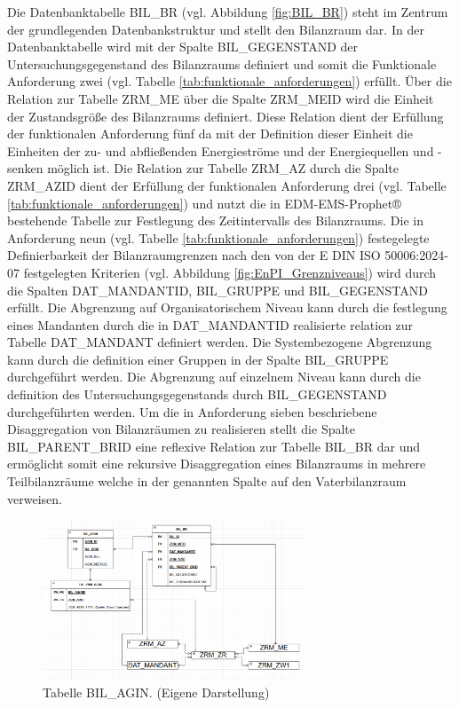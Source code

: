 Die Datenbanktabelle BIL\_BR (vgl. Abbildung \eqref{fig:BIL_BR}) steht im Zentrum der grundlegenden Datenbankstruktur und stellt den Bilanzraum dar.
In der Datenbanktabelle wird mit der Spalte BIL\_GEGENSTAND der Untersuchungsgegenstand des Bilanzraums definiert und somit die Funktionale Anforderung 
zwei (vgl. Tabelle \eqref{tab:funktionale_anforderungen}) erfüllt.
Über die Relation zur Tabelle ZRM\_ME über die Spalte ZRM\_MEID wird die Einheit der Zustandsgröße des Bilanzraums definiert.
Diese Relation dient der Erfüllung der funktionalen Anforderung fünf da mit der Definition dieser Einheit die Einheiten der zu- und abfließenden Energieströme und 
der Energiequellen und -senken möglich ist.
Die Relation zur Tabelle ZRM\_AZ durch die Spalte ZRM\_AZID dient der Erfüllung der funktionalen Anforderung drei (vgl. Tabelle \eqref{tab:funktionale_anforderungen}) und nutzt die 
in EDM-EMS-Prophet® bestehende Tabelle zur Festlegung des Zeitintervalls des Bilanzraums.
Die in Anforderung neun (vgl. Tabelle \eqref{tab:funktionale_anforderungen}) festegelegte Definierbarkeit der Bilanzraumgrenzen nach den von der E DIN ISO 50006:2024-07 
festgelegten Kriterien (vgl. Abbildung \eqref{fig:EnPI_Grenzniveaus}) wird durch die Spalten DAT\_MANDANTID, BIL\_GRUPPE und BIL\_GEGENSTAND erfüllt.
Die Abgrenzung auf Organisatorischem Niveau kann durch die festlegung eines Mandanten durch die in DAT\_MANDANTID realisierte relation zur Tabelle 
DAT\_MANDANT definiert werden. 
Die Systembezogene Abgrenzung kann durch die definition einer Gruppen in der Spalte BIL\_GRUPPE durchgeführt werden. 
Die Abgrenzung auf einzelnem Niveau kann durch die definition des Untersuchungsgegenstands durch BIL\_GEGENSTAND durchgeführten werden.
Um die in Anforderung sieben beschriebene Disaggregation von Bilanzräumen zu realisieren stellt die Spalte BIL\_PARENT\_BRID eine reflexive Relation zur Tabelle BIL\_BR 
dar und ermöglicht somit eine rekursive Disaggregation eines Bilanzraums in mehrere Teilbilanzräume welche in der genannten Spalte auf den Vaterbilanzraum verweisen. 

\begin{figure}[H]
    \centering
    \includegraphics[width=0.7\textwidth]{../../Ressourcen/Abbildungen/Konzept/BIL_AGIN.png}
    \caption{Tabelle BIL\_AGIN. (Eigene Darstellung)}
    \label{fig:BIL_AGIN}
\end{figure}

